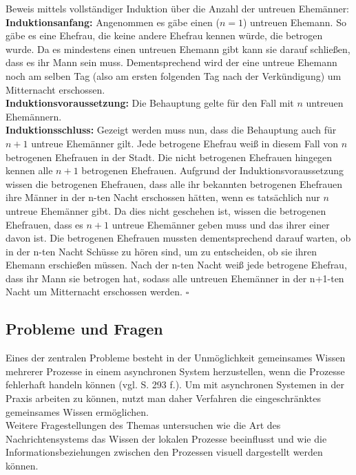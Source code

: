 \documentclass{llncs}
\begin{document}
Beweis mittels vollständiger Induktion über die Anzahl der untreuen Ehemänner:\\
\textbf{Induktionsanfang:} Angenommen es gäbe einen ($n=1$) untreuen Ehemann. So gäbe es eine Ehefrau, die keine andere Ehefrau kennen würde, die betrogen wurde. Da es mindestens einen untreuen Ehemann gibt kann sie darauf schließen, dass es ihr Mann sein muss. Dementsprechend wird der eine untreue Ehemann noch am selben Tag (also am ersten folgenden Tag nach der Verkündigung) um Mitternacht erschossen.\\
\textbf{Induktionsvoraussetzung:} Die Behauptung gelte für den Fall mit $n$ untreuen Ehemännern.\\
\textbf{Induktionsschluss:} Gezeigt werden muss nun, dass die Behauptung auch für $n+1$ untreue Ehemänner gilt.
Jede betrogene Ehefrau weiß in diesem Fall von $n$ betrogenen Ehefrauen in der Stadt. Die nicht betrogenen Ehefrauen hingegen kennen alle $n+1$ betrogenen Ehefrauen.
Aufgrund der Induktionsvoraussetzung wissen die betrogenen Ehefrauen, dass alle ihr bekannten betrogenen Ehefrauen ihre Männer in der n-ten Nacht erschossen hätten, wenn es tatsächlich nur $n$ untreue Ehemänner gibt.
Da dies nicht geschehen ist, wissen die betrogenen Ehefrauen, dass es $n+1$ untreue Ehemänner geben muss und das ihrer einer davon ist.
Die betrogenen Ehefrauen mussten dementsprechend darauf warten, ob in der n-ten Nacht Schüsse zu  hören sind, um zu entscheiden, ob sie ihren Ehemann erschießen müssen.
Nach der n-ten Nacht weiß jede betrogene Ehefrau, dass ihr Mann sie betrogen hat, sodass alle untreuen Ehemänner in der n+1-ten Nacht um Mitternacht erschossen werden. $\square$


\subsection{Probleme und Fragen}
Eines der zentralen Probleme besteht in der Unmöglichkeit gemeinsames Wissen mehrerer Prozesse in einem asynchronen System herzustellen, wenn die Prozesse fehlerhaft handeln können (vgl.\cite{kshemkalyani2011distributed} S. 293 f.). Um mit asynchronen Systemen in der Praxis arbeiten zu können, nutzt man daher Verfahren die eingeschränktes gemeinsames Wissen ermöglichen.\\
Weitere Fragestellungen des Themas untersuchen wie die Art des Nachrichtensystems das Wissen der lokalen Prozesse beeinflusst und wie die Informationsbeziehungen zwischen den Prozessen visuell dargestellt werden können.
\end{document}
